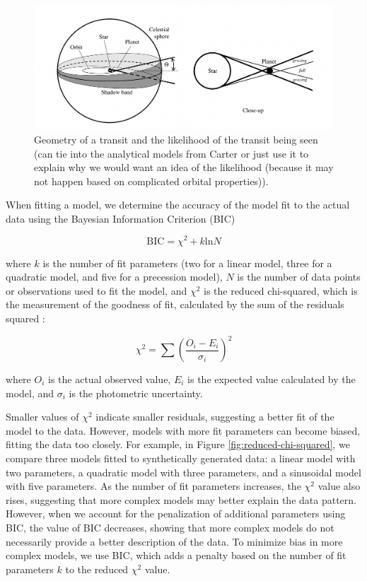 \documentclass[oneside,12pt]{amsart}
\numberwithin{page}{section}
\begin{document}
\begin{figure}[htbp]
    \centering
    \includegraphics[width=0.5\linewidth]{figs/winn_fig3.png}
    \caption{Geometry of a transit and the likelihood of the transit being seen (can tie into the analytical models from Carter or just use it to explain why we would want an idea of the likelihood (because it may not happen based on complicated orbital properties)).}
    \label{fig:winn-fig3}
\end{figure}

When fitting a model, we determine the accuracy of the model fit to the actual data using the Bayesian Information Criterion (BIC) \citep{schwarz1978estimating}

\begin{equation}
    \text{BIC} = \chi^{2} + k\text{ln}N
\end{equation}

where $k$ is the number of fit parameters (two for a linear model, three for a quadratic model, and five for a precession model), $N$ is the number of data points or observations used to fit the model, and $\chi^{2}$ is the reduced chi-squared, which is the measurement of the goodness of fit, calculated by the sum of the residuals squared \citep{pearson1900criterion}:

\begin{equation}
    \chi^{2} = \sum \left( \frac{O_i - E_i}{\sigma_i} \right)^2
\end{equation}

where $O_i$ is the actual observed value, $E_i$ is the expected value calculated by the model, and $\sigma_i$ is the photometric uncertainty.

Smaller values of $\chi^2$ indicate smaller residuals, suggesting a better fit of the model to the data. However, models with more fit parameters can become biased, fitting the data too closely. For example, in Figure \ref{fig:reduced-chi-squared}, we compare three models fitted to synthetically generated data: a linear model with two parameters, a quadratic model with three parameters, and a sinusoidal model with five parameters. As the number of fit parameters increases, the $\chi^2$ value also rises, suggesting that more complex models may better explain the data pattern. However, when we account for the penalization of additional parameters using BIC, the value of BIC decreases, showing that more complex models do not necessarily provide a better description of the data. To minimize bias in more complex models, we use BIC, which adds a penalty based on the number of fit parameters $k$ to the reduced $\chi^2$ value.
\end{document}
